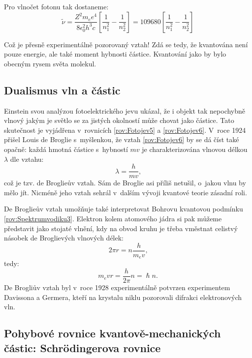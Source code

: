 \noindent Pro vlnočet fotonu tak dostaneme:
\begin{equation}
\tilde{\nu} = \frac{Z^2m_e e^4}{8\epsilon_0^2 h^3c}\left[ \frac{1}{n_1^2} - \frac{1}{n_2^2} \right ] = 109680 \left[ \frac{1}{n_1^2} - \frac{1}{n_2^2} \right ]
\label{rov:Spektrumvodiku9}
\end{equation}

\noindent Což je přesně experimentálně pozorovaný vztah! Zdá se tedy, že kvantována není pouze energie, ale také moment hybnosti částice. Kvantování jako by bylo obecným rysem světa molekul. 

\subsection{Dualismus vln a částic}

Einstein svou analýzou fotoelektrického jevu ukázal, že i objekt tak nepochybně vlnový jakým je světlo se za jistých okolností může chovat jako částice. Tato skutečnost je vyjádřena v~rovnicích \ref{rov:Fotojev5} a \ref{rov:Fotojev6}. V~roce 1924 přišel Louis de Broglie s~myšlenkou, že vztah \ref{rov:Fotojev6} by se dá číst také opačně: každá hmotná částice s~hybností $mv$ je charakterizována vlnovou délkou $\lambda$ dle vztahu:
\begin{equation}
\lambda = \frac{h}{mv}\mbox{,}
\label{rov:Dualismus1}
\end{equation}
\noindent což je tzv. de Broglieův vztah. Sám de Broglie asi příliš netušil, o~jakou vlnu by mělo jít. Nicméně jeho vztah sehrál v~dalším vývoji kvantové teorie zásadní roli. 

De Broglieův vztah umožňuje také interpretovat Bohrovu kvantovou podmínku \ref{rov:Spektrumvodiku3}. Elektron kolem atomového jádra si pak můžeme představit jako stojaté vlnění, kdy na obvod kruhu je třeba vměstnat celistvý násobek de Broglievých vlnových délek:
\begin{equation}
2\pi r = n \frac{h}{m_e v}\mbox{,}
\label{Dualismus2}
\end{equation}
tedy:
\begin{equation}
m_e vr = \frac{h}{2\pi}n = \hslash n \mbox{.}
\label{Dualismus3}
\end{equation}
De Brogliův vztah byl v~roce 1928 experimentálně potvrzen experimentem Davissona a Germera, kteří na krystalu niklu pozorovali difrakci elektronových vln. 

\subsection{Pohybové rovnice kvantově-mechanických částic: Schr\"odingerova rovnice}


